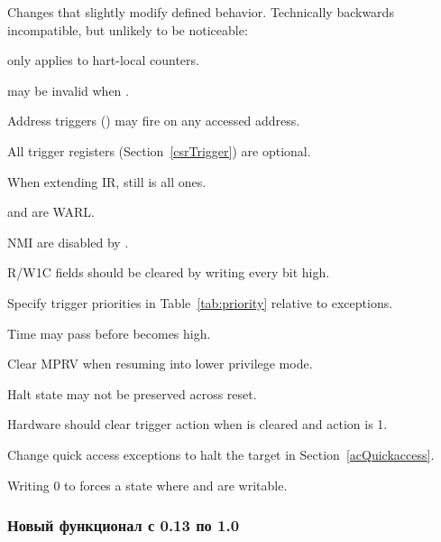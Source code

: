 \begin{steps}{Changes that slightly modify defined behavior. Technically backwards
incompatible, but unlikely to be noticeable:}
    \item \FcsrDcsrStopcount only applies to hart-local counters. 
    \item \FdmDmstatusVersion may be invalid when . 
    \item Address triggers (\RcsrMcontrol) may fire on any accessed address. 
    \item All trigger registers (Section~\ref{csrTrigger}) are optional. 
    \item When extending IR, \RdtmBypass still is all ones. 
    \item \FcsrDcsrEbreaks and \FcsrDcsrEbreaku are WARL. 
    \item NMI are disabled by \FcsrDcsrStepie. 
    \item R/W1C fields should be cleared by writing every bit high. 
    \item Specify trigger priorities in Table~\ref{tab:priority} relative to exceptions. 
    \item Time may pass before \FdmDmcontrolDmactive becomes high. 
    \item Clear MPRV when resuming into lower privilege mode. 
    \item Halt state may not be preserved across reset. 
    \item Hardware should clear trigger action when \FcsrTdataOneDmode is
        cleared and action is 1. 
    \item Change quick access exceptions to halt the target in
    Section~\ref{acQuickaccess}. 
    \item Writing 0 to \RcsrTdataOne forces a state where \RcsrTdataTwo and
        \RcsrTdataThree are writable. 
\end{steps}

\subsubsection{Новый функционал с 0.13 по 1.0}

